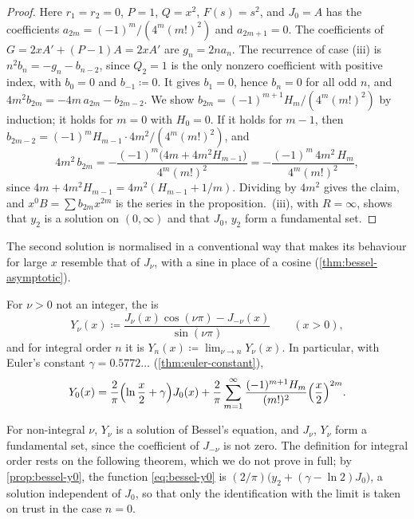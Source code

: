 \begin{proof}
Here $r_1=r_2=0$, $P=1$, $Q=x^2$, $F(s)=s^2$, and $J_0=A$ has the coefficients $a_{2m}=(-1)^m/(4^m(m!)^2)$ and $a_{2m+1}=0$. The coefficients of $G=2xA'+(P-1)A=2xA'$ are $g_n=2na_n$. The recurrence of case (iii) is $n^2b_n=-g_n-b_{n-2}$, since $Q_2=1$ is the only nonzero coefficient with positive index, with $b_0=0$ and $b_{-1}\coloneqq0$. It gives $b_1=0$, hence $b_n=0$ for all odd $n$, and $4m^2b_{2m}=-4m\,a_{2m}-b_{2m-2}$. We show $b_{2m}=(-1)^{m+1}H_m/(4^m(m!)^2)$ by induction; it holds for $m=0$ with $H_0=0$. If it holds for $m-1$, then $b_{2m-2}=(-1)^mH_{m-1}\cdot4m^2/(4^m(m!)^2)$, and
\[
4m^2\,b_{2m}=-\frac{(-1)^m\bigl(4m+4m^2H_{m-1}\bigr)}{4^m(m!)^2}=-\frac{(-1)^m\,4m^2\,H_m}{4^m(m!)^2},
\]
since $4m+4m^2H_{m-1}=4m^2(H_{m-1}+1/m)$. Dividing by $4m^2$ gives the claim, and $x^0B=\sum b_{2m}x^{2m}$ is the series in the proposition. \,(iii), with $R=\infty$, shows that $y_2$ is a solution on $(0,\infty)$ and that $J_0$, $y_2$ form a fundamental set.
\end{proof}

The second solution is normalised in a conventional way that makes its behaviour for large $x$ resemble that of $J_\nu$, with a sine in place of a cosine (\cref{thm:bessel-asymptotic}).

\begin{definition}
\label{def:bessel-y}
For $\nu>0$ not an integer, the  is
\[
Y_\nu(x)\coloneqq\frac{J_\nu(x)\cos(\nu\pi)-J_{-\nu}(x)}{\sin(\nu\pi)}\qquad(x>0),
\]
and for integral order $n$ it is $Y_n(x)\coloneqq\lim_{\nu\to n}Y_\nu(x)$. In particular, with Euler's constant $\gamma=0.5772\ldots$ (\cref{thm:euler-constant}),
\begin{equation}
Y_0(x)=\frac2\pi\Bigl(\ln\frac x2+\gamma\Bigr)J_0(x)+\frac2\pi\sum_{m=1}^\infty\frac{(-1)^{m+1}H_m}{(m!)^2}\Bigl(\frac x2\Bigr)^{2m} .
\label{eq:bessel-y0}
\end{equation}
\end{definition}

For non-integral $\nu$, $Y_\nu$ is a solution of Bessel's equation, and $J_\nu$, $Y_\nu$ form a fundamental set, since the coefficient of $J_{-\nu}$ is not zero. The definition for integral order rests on the following theorem, which we do not prove in full; by \cref{prop:bessel-y0}, the function \eqref{eq:bessel-y0} is $(2/\pi)\bigl(y_2+(\gamma-\ln2)J_0\bigr)$, a solution independent of $J_0$, so that only the identification with the limit is taken on trust in the case $n=0$.

